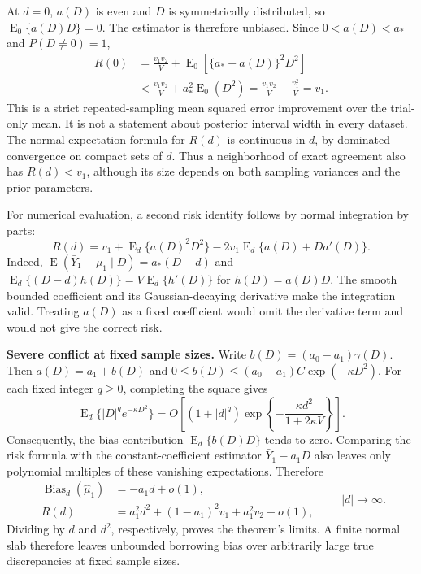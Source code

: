 \documentclass[11pt]{article}
\newcommand{\E}{\operatorname{E}}
\theoremstyle{remark}\newtheorem{remark}{Remark}[section]
\begin{document}
At $d=0$, $a(D)$ is even and $D$ is symmetrically distributed, so $\E_0\{a(D)D\}=0$. The estimator is therefore unbiased. Since $0<a(D)<a_*$ and $P(D\ne0)=1$,
\begin{equation}\label{eq:agreement_risk_gain}
\begin{aligned}
R(0)&=\frac{v_1v_2}{V}+\E_0\!\left[\{a_*-a(D)\}^2D^2\right]\\
&<\frac{v_1v_2}{V}+a_*^2\E_0(D^2)
=\frac{v_1v_2}{V}+\frac{v_1^2}{V}=v_1.
\end{aligned}
\end{equation}
This is a strict repeated-sampling mean squared error improvement over the trial-only mean. It is not a statement about posterior interval width in every dataset. The normal-expectation formula for $R(d)$ is continuous in $d$, by dominated convergence on compact sets of $d$. Thus a neighborhood of exact agreement also has $R(d)<v_1$, although its size depends on both sampling variances and the prior parameters.

For numerical evaluation, a second risk identity follows by normal integration by parts:
\begin{equation}\label{eq:regional_stein_risk}
R(d)=v_1+\E_d\{a(D)^2D^2\}
-2v_1\E_d\{a(D)+Da'(D)\}.
\end{equation}
Indeed, $\E(\bar Y_1-\mu_1\mid D)=a_*(D-d)$ and
$\E_d\{(D-d)h(D)\}=V\E_d\{h'(D)\}$ for $h(D)=a(D)D$.
The smooth bounded coefficient and its Gaussian-decaying derivative make the integration valid. Treating $a(D)$ as a fixed coefficient would omit the derivative term and would not give the correct risk.

\noindent\textbf{Severe conflict at fixed sample sizes.}
Write $b(D)=(a_0-a_1)\gamma(D)$. Then $a(D)=a_1+b(D)$ and $0\leq b(D)\leq(a_0-a_1)C\exp(-\kappa D^2)$. For each fixed integer $q\geq0$, completing the square gives
\[
\E_d\{|D|^q e^{-\kappa D^2}\}
=O\!\left[(1+|d|^q)
\exp\!\left\{-\frac{\kappa d^2}{1+2\kappa V}\right\}\right].
\]
Consequently, the bias contribution $\E_d\{b(D)D\}$ tends to zero. Comparing the risk formula with the constant-coefficient estimator $\bar Y_1-a_1D$ also leaves only polynomial multiples of these vanishing expectations. Therefore
\begin{equation}\label{eq:regional_conflict_limits}
\begin{aligned}
\operatorname{Bias}_d(\widehat\mu_1)&=-a_1d+o(1),\\
R(d)&=a_1^2d^2+(1-a_1)^2v_1+a_1^2v_2+o(1),
\end{aligned}
\qquad |d|\to\infty.
\end{equation}
Dividing by $d$ and $d^2$, respectively, proves the theorem's limits. A finite normal slab therefore leaves unbounded borrowing bias over arbitrarily large true discrepancies at fixed sample sizes.
\end{document}
